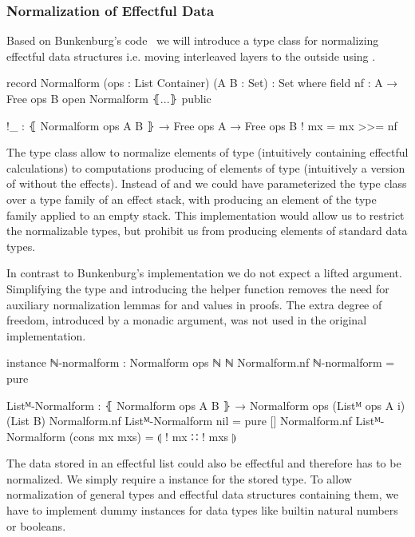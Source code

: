 \subsubsection{Normalization of Effectful Data}

Based on Bunkenburg's code~\cite{bunkenburg2019modeling} we will introduce a
type class for normalizing effectful data structures i.e. moving interleaved
 layers to the outside using \AgdaFunction{>>=}.

\begin{code}
record Normalform (ops : List Container) (A B : Set) : Set where
  field
    nf : A → Free ops B
open Normalform ⦃...⦄ public

!_ : ⦃ Normalform ops A B ⦄ → Free ops A → Free ops B
! mx = mx >>= nf
\end{code}

The type class allow to normalize elements of type  (intuitively
containing effectful calculations) to computations producing of elements of type
 (intuitively a version of  without the effects).
Instead of  and  we could have parameterized the
type class over a type family of an effect stack, with 
producing an element of the type family applied to an empty stack.
This implementation would allow us to restrict the normalizable types, but
prohibit us from producing elements of standard data types.

In contrast to Bunkenburg's implementation we do not expect a lifted argument.
Simplifying the type and introducing the helper function \AgdaFunction{!\_}
removes the need for auxiliary normalization lemmas for
 and  values in
proofs.
The extra degree of freedom, introduced by a monadic argument, was not used in
the original implementation.

\begin{code}
instance
  ℕ-normalform : Normalform ops ℕ ℕ
  Normalform.nf ℕ-normalform = pure

  Listᴹ-Normalform : ⦃ Normalform ops A B ⦄ →
    Normalform ops (Listᴹ ops A {i}) (List B)
  Normalform.nf Listᴹ-Normalform nil            = pure []
  Normalform.nf Listᴹ-Normalform (cons mx mxs)  = ⦇ ! mx ∷ ! mxs ⦈
\end{code}
The data stored in an effectful list could also be effectful and therefore has
to be normalized.
We simply require a  instance for the stored type.
To allow normalization of general types and effectful data structures containing
them, we have to implement dummy instances for data types like builtin natural
numbers or booleans.

